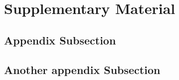 \newpage

\appendix
\section*{Supplementary Material}
\renewcommand{\thesubsection}{\Alph{subsection}}

\subsection{Appendix Subsection}

\blindtext

\subsection{Another appendix Subsection}

\blindtext